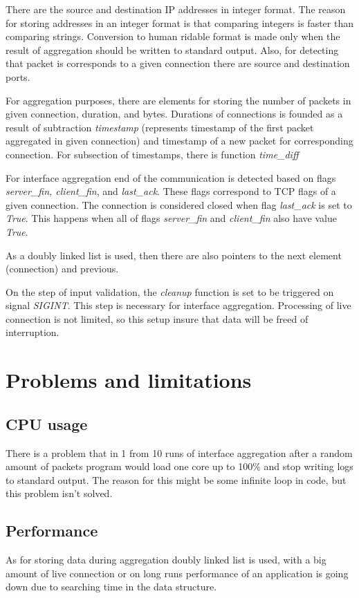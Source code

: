 \documentclass[12pt,a4paper]{article}
\begin{document}
    There are the source and destination IP addresses in integer format. The 
    reason for storing addresses in an integer format is that comparing integers
    is faster than comparing strings. Conversion to human ridable format is 
    made only when the result of aggregation should be written to standard output. 
    Also, for detecting that packet is corresponds to a given connection there 
    are source and destination ports. 

    For aggregation purposes, there are elements for storing the number of packets
    in given connection, duration, and bytes. Durations of connections is founded 
    as a result of subtraction \textit{timestamp} (represents timestamp of the first 
    packet aggregated in given connection) and timestamp of a new packet for 
    corresponding connection. For subsection of timestamps, there is function 
    \textit{time\_diff} 

    For interface aggregation end of the communication is detected based on flags 
    \textit{server\_fin, client\_fin}, and \textit{last\_ack}. These flags correspond 
    to TCP flags of a given connection. The connection is considered closed when 
    flag \textit{last\_ack} is set to \textit{True}. This happens when all of 
    flags \textit{server\_fin} and \textit{client\_fin} also have value \textit{True}. 

    As a doubly linked list is used, then there are also pointers to the next 
    element (connection) and previous. 

    On the step of input validation, the \textit{cleanup} function is set to be 
    triggered on signal \textit{SIGINT}. This step is necessary for interface 
    aggregation. Processing of live connection is not limited, so this setup 
    insure that data will be freed of interruption.

    \section{Problems and limitations}
    \subsection{CPU usage}
    There is a problem that in 1 from 10 runs of interface aggregation after a 
    random amount of packets program would load one core up to 100\% and stop 
    writing logs to standard output. The reason for this might be some infinite 
    loop in code, but this problem isn't solved.  

    \subsection{Performance}
    As for storing data during aggregation doubly linked list is used, with a 
    big amount of live connection or on long runs performance of an application 
    is going down due to searching time in the data structure.

    \newpage
    \nocite{*}
    
    
\end{document}
